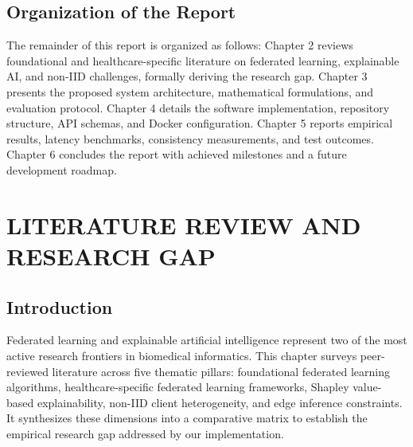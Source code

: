 \documentclass[12pt,a4paper,oneside]{report}
\begin{document}
\section{Organization of the Report}
The remainder of this report is organized as follows: Chapter 2 reviews foundational and healthcare-specific literature on federated learning, explainable AI, and non-IID challenges, formally deriving the research gap. Chapter 3 presents the proposed system architecture, mathematical formulations, and evaluation protocol. Chapter 4 details the software implementation, repository structure, API schemas, and Docker configuration. Chapter 5 reports empirical results, latency benchmarks, consistency measurements, and test outcomes. Chapter 6 concludes the report with achieved milestones and a future development roadmap.



\chapter{LITERATURE REVIEW AND RESEARCH GAP}

\section{Introduction}
Federated learning and explainable artificial intelligence represent two of the most active research frontiers in biomedical informatics. This chapter surveys peer-reviewed literature across five thematic pillars: foundational federated learning algorithms, healthcare-specific federated learning frameworks, Shapley value-based explainability, non-IID client heterogeneity, and edge inference constraints. It synthesizes these dimensions into a comparative matrix to establish the empirical research gap addressed by our implementation.
\end{document}
